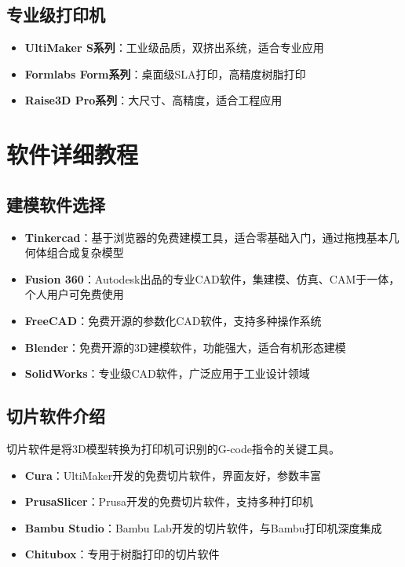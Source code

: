 \documentclass[12pt,UTF8]{ctexbook}
\begin{document}
\subsection{专业级打印机}
\begin{itemize}
\item \textbf{UltiMaker S系列}：工业级品质，双挤出系统，适合专业应用
\item \textbf{Formlabs Form系列}：桌面级SLA打印，高精度树脂打印
\item \textbf{Raise3D Pro系列}：大尺寸、高精度，适合工程应用
\end{itemize}

\section{软件详细教程}

\subsection{建模软件选择}
\begin{itemize}
\item \textbf{Tinkercad}：基于浏览器的免费建模工具，适合零基础入门，通过拖拽基本几何体组合成复杂模型
\item \textbf{Fusion 360}：Autodesk出品的专业CAD软件，集建模、仿真、CAM于一体，个人用户可免费使用
\item \textbf{FreeCAD}：免费开源的参数化CAD软件，支持多种操作系统
\item \textbf{Blender}：免费开源的3D建模软件，功能强大，适合有机形态建模
\item \textbf{SolidWorks}：专业级CAD软件，广泛应用于工业设计领域
\end{itemize}

\subsection{切片软件介绍}
切片软件是将3D模型转换为打印机可识别的G-code指令的关键工具。
\begin{itemize}
\item \textbf{Cura}：UltiMaker开发的免费切片软件，界面友好，参数丰富
\item \textbf{PrusaSlicer}：Prusa开发的免费切片软件，支持多种打印机
\item \textbf{Bambu Studio}：Bambu Lab开发的切片软件，与Bambu打印机深度集成
\item \textbf{Chitubox}：专用于树脂打印的切片软件
\end{itemize}
\end{document}
